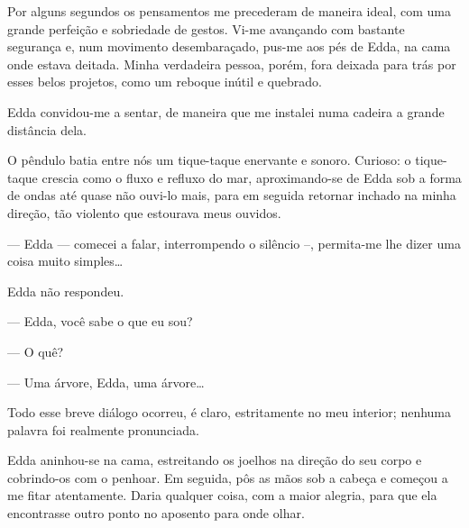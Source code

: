 Por alguns segundos os pensamentos me precederam de maneira ideal, com uma
grande perfeição e sobriedade de gestos. Vi-me avançando com bastante
segurança e, num movimento desembaraçado, pus-me aos pés de Edda, na cama
onde estava deitada. Minha verdadeira pessoa, porém, fora deixada para trás
por esses belos projetos, como um reboque inútil e quebrado.

Edda convidou-me a sentar, de maneira que me instalei numa cadeira a grande
distância dela.

O pêndulo batia entre nós um tique-taque enervante e sonoro. Curioso: o
tique-taque crescia como o fluxo e refluxo do mar, aproximando-se de Edda sob
a forma de ondas até quase não ouvi-lo mais, para em seguida retornar inchado
na minha direção, tão violento que estourava meus ouvidos.

--- Edda --- comecei a falar, interrompendo o silêncio --, permita-me lhe
    dizer uma coisa muito simples\ldots{}

Edda não respondeu.

--- Edda, você sabe o que eu sou?

--- O quê?

--- Uma árvore, Edda, uma árvore\ldots{}

Todo esse breve diálogo ocorreu, é claro, estritamente no meu interior;
nenhuma palavra foi realmente pronunciada.

Edda aninhou-se na cama, estreitando os joelhos na direção do seu corpo e
cobrindo-os com o penhoar. Em seguida, pôs as mãos sob a cabeça e começou a
me fitar atentamente. Daria qualquer coisa, com a maior alegria, para que ela
encontrasse outro ponto no aposento para onde olhar.


